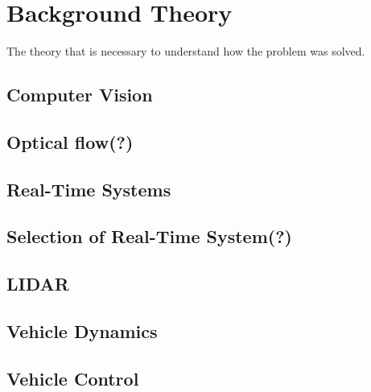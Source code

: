 \section{Background Theory}

The theory that is necessary to understand how the problem was solved.

\subsection{Computer Vision}

\subsection{Optical flow(?)}

\subsection{Real-Time Systems}

\subsection{Selection of Real-Time System(?)}

\subsection{LIDAR}

\subsection{Vehicle Dynamics}

\subsection{Vehicle Control}

